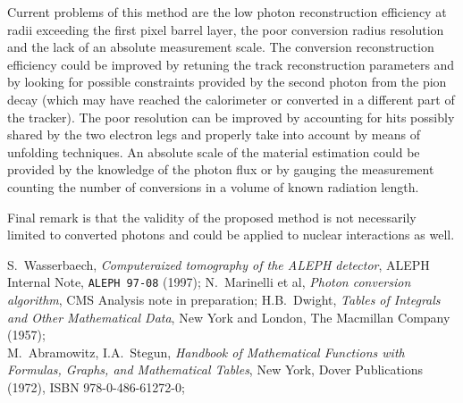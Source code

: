 \documentclass[a4paper]{jpconf}
\begin{document}
Current problems of this method are the low photon reconstruction efficiency at radii exceeding the first pixel barrel layer, the poor
conversion radius resolution and the lack of an absolute measurement scale.
The conversion reconstruction efficiency could be improved by retuning the track reconstruction parameters and 
by looking for possible constraints provided by the second photon from the pion decay 
(which may have reached the calorimeter or converted in a different part of the tracker).
The poor resolution can be improved by accounting for hits possibly shared by the two electron legs and properly take into account by means of 
unfolding techniques.
An absolute scale of the material estimation could be provided by the knowledge of the photon flux or by gauging the measurement 
counting the number of conversions in a volume of known radiation length.

Final remark is that the validity of the proposed method is not necessarily limited to converted photons and could be applied to
nuclear interactions as well.


\begin{thebibliography}{99}

 S.~Wasserbaech, {\em Computeraized tomography of the
    ALEPH detector}, ALEPH Internal Note, {\tt ALEPH 97-08} (1997);
 N.~Marinelli et al, {\em Photon conversion algorithm},
  CMS Analysis note in preparation;
 H.B.~Dwight, {\em Tables of Integrals and Other
    Mathematical Data}, New York and London, The Macmillan Company (1957);\\
  M.~Abramowitz, I.A.~Stegun, {\em Handbook of Mathematical
  Functions with Formulas, Graphs, and Mathematical Tables}, New York,
  Dover Publications (1972), ISBN 978-0-486-61272-0;

\end{thebibliography}
\end{document}
